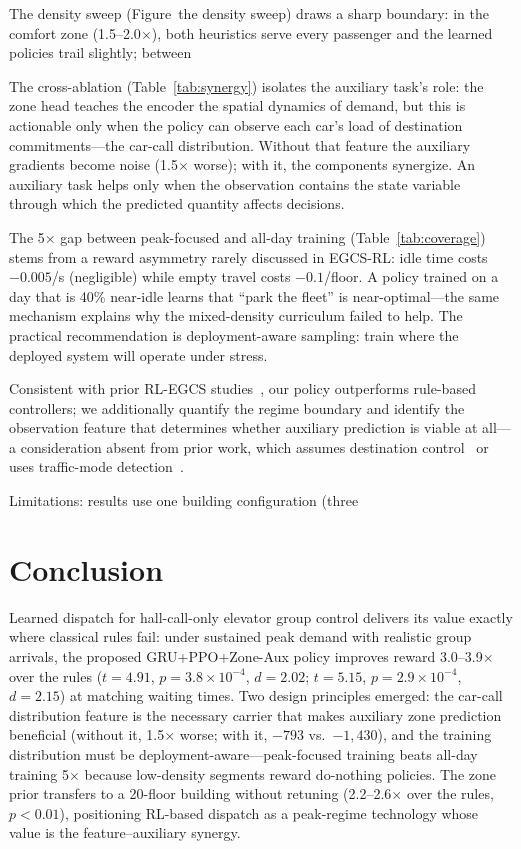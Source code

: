 \documentclass{IEEEcsmag}
\begin{document}
The density sweep (Figure~the density sweep) draws a sharp boundary:
in the comfort zone (1.5--2.0$\times$), both heuristics serve every
passenger and the learned policies trail slightly; between

The cross-ablation (Table~\ref{tab:synergy}) isolates the
auxiliary task's role: the zone head teaches the encoder the spatial
dynamics of demand, but this is actionable only when the policy can
observe each car's load of destination commitments---the car-call
distribution. Without that feature the auxiliary gradients become
noise (1.5$\times$ worse); with it, the components synergize. An
auxiliary task helps only when the observation contains the state
variable through which the predicted quantity affects decisions.

The 5$\times$ gap between peak-focused and all-day training
(Table~\ref{tab:coverage}) stems from a reward asymmetry rarely
discussed in EGCS-RL: idle time costs $-0.005$/s (negligible) while
empty travel costs $-0.1$/floor. A policy trained on a day that is
40\% near-idle learns that ``park the fleet'' is near-optimal---the
same mechanism explains why the mixed-density curriculum failed to
help. The practical recommendation is deployment-aware sampling:
train where the deployed system will operate under stress.

Consistent with prior RL-EGCS studies~\cite{vu2025rl,wan2024traffic},
our policy outperforms rule-based controllers; we additionally
quantify the regime boundary and identify the observation feature
that determines whether auxiliary prediction is viable at all---a
consideration absent from prior work, which assumes destination
control~\cite{sorsa2022destination,ruokokoski2016assignment} or
uses traffic-mode detection~\cite{wan2024traffic}.

Limitations: results use one building configuration (three

\section{Conclusion}

Learned dispatch for hall-call-only elevator group control delivers
its value exactly where classical rules fail: under sustained peak
demand with realistic group arrivals, the proposed GRU+PPO+Zone-Aux
policy improves reward 3.0--3.9$\times$ over the rules ($t = 4.91$,
$p = 3.8\times10^{-4}$, $d = 2.02$; $t = 5.15$, $p = 2.9\times
10^{-4}$, $d = 2.15$) at matching waiting times. Two design
principles emerged: the car-call distribution feature is the
necessary carrier that makes auxiliary zone prediction beneficial
(without it, 1.5$\times$ worse; with it, $-793$ vs.~$-1{,}430$),
and the training distribution must be deployment-aware---peak-focused
training beats all-day training 5$\times$ because low-density
segments reward do-nothing policies. The zone prior transfers to a
20-floor building without retuning (2.2--2.6$\times$ over the
rules, $p < 0.01$), positioning RL-based dispatch as a peak-regime
technology whose value is the feature--auxiliary synergy.
\label{sec:conclusion}
\end{document}
